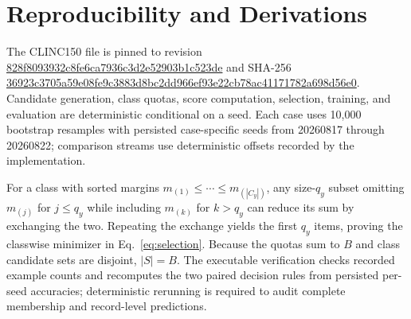 \section{Reproducibility and Derivations}\label{app:derivations}
The CLINC150 file is pinned to revision \url{828f8093932c8fe6ca7936c3d2e52903b1c523de} and SHA-256 \url{36923c3705a59e08fe9c3883d8bc2dd966ef93e22cb78ac41171782a698d56e0}. Candidate generation, class quotas, score computation, selection, training, and evaluation are deterministic conditional on a seed. Each case uses 10,000 bootstrap resamples with persisted case-specific seeds from 20260817 through 20260822; comparison streams use deterministic offsets recorded by the implementation.

For a class with sorted margins $m_{(1)}\leq\cdots\leq m_{(|C_y|)}$, any size-$q_y$ subset omitting $m_{(j)}$ for $j\leq q_y$ while including $m_{(k)}$ for $k>q_y$ can reduce its sum by exchanging the two. Repeating the exchange yields the first $q_y$ items, proving the classwise minimizer in Eq.~\ref{eq:selection}. Because the quotas sum to $B$ and class candidate sets are disjoint, $|S|=B$. The executable verification checks recorded example counts and recomputes the two paired decision rules from persisted per-seed accuracies; deterministic rerunning is required to audit complete membership and record-level predictions.
